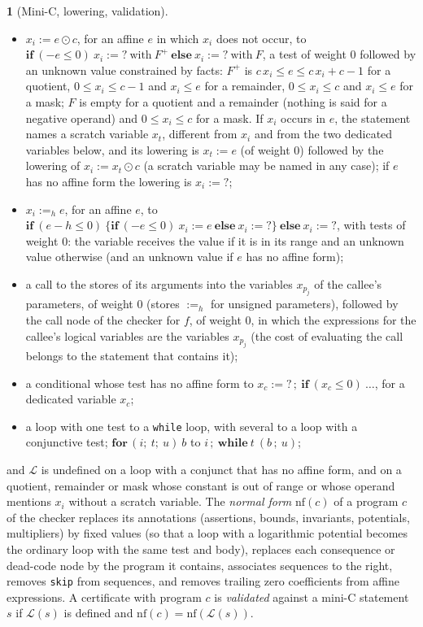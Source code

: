 \documentclass[oneside,english]{amsart}
\numberwithin{equation}{section}
\numberwithin{figure}{section}
\theoremstyle{plain}
\theoremstyle{definition}
\newtheorem{defn}[thm]{\protect\definitionname}
\theoremstyle{plain}
\theoremstyle{remark}
\theoremstyle{plain}
\theoremstyle{definition}
\theoremstyle{plain}
\theoremstyle{remark}
\providecommand{\definitionname}{Definition}
\begin{document}
\begin{defn}[Mini-C, lowering, validation]
\begin{itemize}
    \item $x_i := e \odot c$, for an affine $e$ in which $x_i$ does not occur, to $\mathbf{if}\ (-e \le 0)\ x_i := ?\ \mathrm{with}\ F^{+}\ \mathbf{else}\ x_i := ?\ \mathrm{with}\ F$, a test of weight $0$ followed by an unknown value constrained by facts: $F^{+}$ is $c\,x_i \le e \le c\,x_i + c - 1$ for a quotient, $0 \le x_i \le c - 1$ and $x_i \le e$ for a remainder, $0 \le x_i \le c$ and $x_i \le e$ for a mask; $F$ is empty for a quotient and a remainder (nothing is said for a negative operand) and $0 \le x_i \le c$ for a mask. If $x_i$ occurs in $e$, the statement names a scratch variable $x_t$, different from $x_i$ and from the two dedicated variables below, and its lowering is $x_t := e$ (of weight $0$) followed by the lowering of $x_i := x_t \odot c$ (a scratch variable may be named in any case); if $e$ has no affine form the lowering is $x_i := ?$;
    \item $x_i :=_h e$, for an affine $e$, to $\mathbf{if}\ (e - h \le 0)\ \{\mathbf{if}\ (-e \le 0)\ x_i := e\ \mathbf{else}\ x_i := ?\}\ \mathbf{else}\ x_i := ?$, with tests of weight $0$: the variable receives the value if it is in its range and an unknown value otherwise (and an unknown value if $e$ has no affine form);
    \item a call to the stores of its arguments into the variables $x_{p_j}$ of the callee's parameters, of weight $0$ (stores $:=_h$ for unsigned parameters), followed by the call node of the checker for $f$, of weight $0$, in which the expressions for the callee's logical variables are the variables $x_{p_j}$ (the cost of evaluating the call belongs to the statement that contains it);
    \item a conditional whose test has no affine form to $x_c := ?\,;\ \mathbf{if}\ (x_c \le 0)\ \dots$, for a dedicated variable $x_c$;
    \item a loop with one test to a \texttt{while} loop, with several to a loop with a conjunctive test; $\mathbf{for}\,(i;\ t;\ u)\ b$ to $i\,;\ \mathbf{while}\ t\ (b\,;\ u)$;
\end{itemize}
and $\mathcal{L}$ is undefined on a loop with a conjunct that has no affine form, and on a quotient, remainder or mask whose constant is out of range or whose operand mentions $x_i$ without a scratch variable. The \emph{normal form} $\mathrm{nf}(c)$ of a program $c$ of the checker replaces its annotations (assertions, bounds, invariants, potentials, multipliers) by fixed values (so that a loop with a logarithmic potential becomes the ordinary loop with the same test and body), replaces each consequence or dead-code node by the program it contains, associates sequences to the right, removes \texttt{skip} from sequences, and removes trailing zero coefficients from affine expressions. A certificate with program $c$ is \emph{validated} against a mini-C statement $s$ if $\mathcal{L}(s)$ is defined and $\mathrm{nf}(c) = \mathrm{nf}(\mathcal{L}(s))$.
\end{defn}
\end{document}
